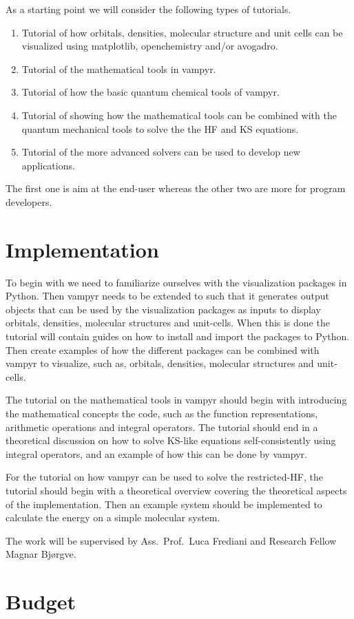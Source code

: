 \documentclass[12pt]{article}
\begin{document}
As a starting point we will consider the following types of tutorials.

\begin{enumerate}
    \item Tutorial of how orbitals, densities, molecular structure and unit cells
    can be visualized using matplotlib, openchemistry and/or avogadro.
    \item Tutorial of the mathematical tools in \ac{vampyr}.
    \item Tutorial of how the basic quantum chemical tools of \ac{vampyr}.
    \item Tutorial of showing how the mathematical tools can be combined
    with the quantum mechanical tools to solve the
    the \ac{HF} and \ac{KS} equations.
    \item Tutorial of the more advanced solvers can be used to develop new
    applications.
\end{enumerate}

The first one is aim at the end-user whereas the other two are more
for program developers.

\section{Implementation}

To begin with we need to familiarize ourselves with the visualization packages in
Python.
Then \ac{vampyr} needs to be extended to such that it generates output objects
that can be used by the visualization packages as inputs to display orbitals,
densities, molecular structures and unit-cells. When this is done the tutorial
will contain guides on how to install and import the packages to Python.
Then create examples of how the different
packages can be combined with \ac{vampyr} to visualize, such as, orbitals,
densities, molecular structures and unit-cells.

The tutorial on the mathematical tools in \ac{vampyr} should begin
with introducing the mathematical concepts the code, such as
the function representations, arithmetic operations and integral
operators. The tutorial should end in a theoretical discussion
on how to solve \ac{KS}-like equations self-consistently using
integral operators, and an example of how this can be done
by \ac{vampyr}.

For the tutorial on how \ac{vampyr} can be used to solve the restricted-\ac{HF},
the tutorial should begin with a theoretical overview covering the theoretical
aspects of the implementation. Then an example system should be implemented
to calculate the energy on a simple molecular system.

The work will be supervised by Ass.~Prof.~Luca Frediani and Research Fellow
Magnar Bj\o rgve.

\section{Budget}





\end{document}
